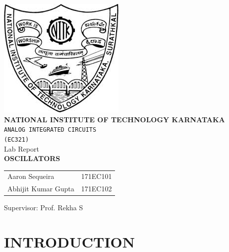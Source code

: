 \documentclass[12pt]{report}
\begin{document}
\begin{titlepage}
\centering
\includegraphics[scale=0.7]{figs/NITK_logo.jpg}\\
\vspace{1cm}
\Huge \textbf{NATIONAL INSTITUTE OF TECHNOLOGY KARNATAKA}\\
\vspace{2.5cm}
\huge \texttt{ANALOG INTEGRATED CIRCUITS \\(EC321)}\\
\vspace{0.50cm}
\huge Lab Report \\
\vspace{0.50cm}
\Huge \centering \textbf{OSCILLATORS} \\
\vspace{2.5cm}

\begin{Large}
\begin{center}
\begin{tabular}{ l c }
 Aaron Sequeira & 171EC101 \\ 
 Abhijit Kumar Gupta & 171EC102
\end{tabular}
\end{center}
\end{Large}

\vspace{0.7cm}
\Large \textsf{Supervisor: Prof. Rekha S}\\
\end{titlepage}







\tableofcontents

\glsaddall

\chapter{INTRODUCTION}
\lipsum[0]
\label{chap:introduction}
\end{document}
